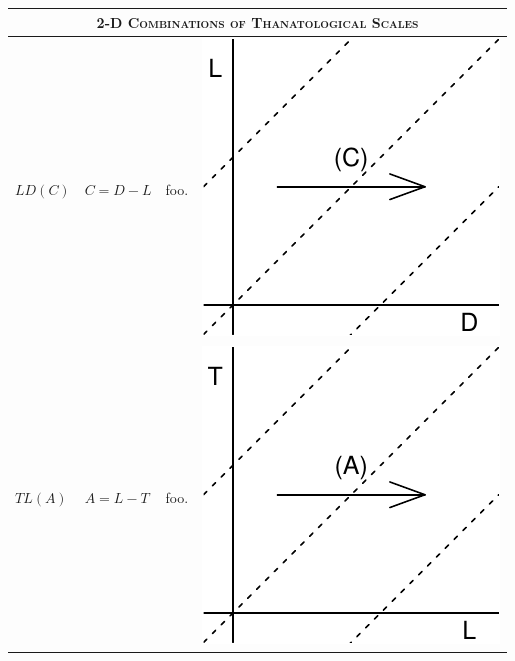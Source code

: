 \documentclass[
  12pt
]{scrartcl}
\begin{document}
\begin{center}
\begin{longtable}{m{}m{}m{}m{}}
  \midrule
  \multicolumn{4}{c}{\textsc{2-D Combinations of Thanatological Scales}} \\
  \midrule
  $LD(C)$ & $C = D - L$ & 
  foo. &
  \includegraphics[width = \linewidth]{../fig/LDc.pdf} \\
  \midrule
  $TL(A)$ & $A = L - T$ & 
  foo. &
  \includegraphics[width = \linewidth]{../fig/TLa.pdf} \\

\end{longtable}
\end{center}
\end{document}
